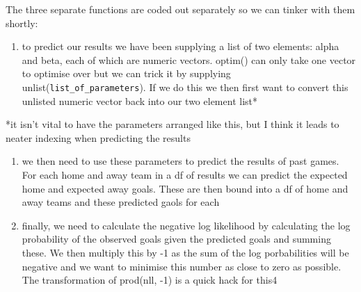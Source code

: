 \documentclass[]{article}
\providecommand{\tightlist}{%
  \setlength{\itemsep}{0pt}\setlength{\parskip}{0pt}}
\begin{document}
The three separate functions are coded out separately so we can tinker
with them shortly:

\begin{enumerate}
\def\labelenumi{\arabic{enumi})}
\tightlist
\item
  to predict our results we have been supplying a list of two elements:
  alpha and beta, each of which are numeric vectors. optim() can only
  take one vector to optimise over but we can trick it by supplying
  unlist(\texttt{list\_of\_parameters}). If we do this we then first
  want to convert this unlisted numeric vector back into our two element
  list*
\end{enumerate}

*it isn't vital to have the parameters arranged like this, but I think
it leads to neater indexing when predicting the results

\begin{enumerate}
\def\labelenumi{\arabic{enumi})}
\setcounter{enumi}{1}
\item
  we then need to use these parameters to predict the results of past
  games. For each home and away team in a df of results we can predict
  the expected home and expected away goals. These are then bound into a
  df of home and away teams and these predicted gaols for each
\item
  finally, we need to calculate the negative log likelihood by
  calculating the log probability of the observed goals given the
  predicted goals and summing these. We then multiply this by -1 as the
  sum of the log porbabilities will be negative and we want to minimise
  this number as close to zero as possible. The transformation of
  prod(nll, -1) is a quick hack for this4
\end{enumerate}
\end{document}
